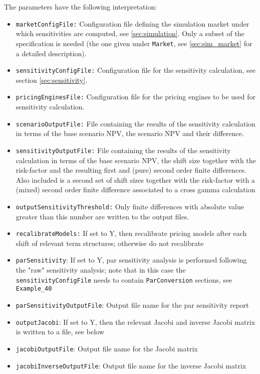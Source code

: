 {The parameters have the following interpretation:

\begin{itemize}
\item {\tt marketConfigFile:} Configuration file defining the simulation market under which sensitivities are computed,
  see \ref{sec:simulation}. Only a subset of the specification is needed (the one given under {\tt Market}, see
  \ref{sec:sim_market} for a detailed description).
\item {\tt sensitivityConfigFile:} Configuration file  for the sensitivity calculation, see section \ref{sec:sensitivity}.
\item {\tt pricingEnginesFile:} Configuration file for the pricing engines to be used for sensitivity calculation.
\item {\tt scenarioOutputFile:} File containing the results of the sensitivity calculation in terms of the base scenario
  NPV, the scenario NPV and their difference.
\item {\tt sensitivityOutputFile:} File containing the results of the sensitivity calculation in terms of the base scenario
  NPV, the shift size together with the risk-factor and the resulting first and (pure) second order finite differences.
  Also included is a second set of shift sizes together with the risk-factor with a (mixed) second order finite difference associated to a cross gamma calculation
\item {\tt outputSensitivityThreshold:} Only finite differences with absolute value greater than this number are written
  to the output files.
\item {\tt recalibrateModels:} If set to Y, then recalibrate pricing models after each shift of relevant term structures;
  otherwise do not recalibrate
\item {\tt parSensitivity}: If set to Y, par sensitivity analysis is performed following the "raw" sensitivity analysis;
  note that in this case the  {\tt sensitivityConfigFile} needs to contain {\tt ParConversion} sections, see {\tt Example\_40}   
\item {\tt parSensitivityOutputFile}: Output file name for the par sensitivity report
\item {\tt outputJacobi}: If set to Y, then the relevant Jacobi and inverse Jacobi matrix is written to a file, see below
\item {\tt jacobiOutputFile}: Output file name for the Jacobi matrix
\item {\tt jacobiInverseOutputFile}: Output file name for the inverse Jacobi matrix
\end{itemize}

}

